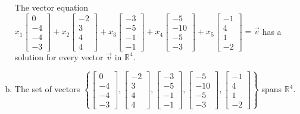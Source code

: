 \begin{exerciseAnswer}
\begin{enumerate}[(a)]
\begin{center}\begin{minipage}{0.8\textwidth}
 The vector equation \( x_{1} \left[\begin{array}{c}
0 \\
-4 \\
-4 \\
-3
\end{array}\right] + x_{2} \left[\begin{array}{c}
-2 \\
3 \\
4 \\
4
\end{array}\right] + x_{3} \left[\begin{array}{c}
-3 \\
-5 \\
-1 \\
-1
\end{array}\right] + x_{4} \left[\begin{array}{c}
-5 \\
-10 \\
-5 \\
-3
\end{array}\right] + x_{5} \left[\begin{array}{c}
-1 \\
4 \\
1 \\
-2
\end{array}\right] =\vec{v}\) has a solution for every vector \(\vec{v}\) in \(\mathbb{R}^4\). 
\end{minipage}\end{center}
    
\item  The set of vectors \( \left\{ \left[\begin{array}{c}
0 \\
-4 \\
-4 \\
-3
\end{array}\right] , \left[\begin{array}{c}
-2 \\
3 \\
4 \\
4
\end{array}\right] , \left[\begin{array}{c}
-3 \\
-5 \\
-1 \\
-1
\end{array}\right] , \left[\begin{array}{c}
-5 \\
-10 \\
-5 \\
-3
\end{array}\right] , \left[\begin{array}{c}
-1 \\
4 \\
1 \\
-2
\end{array}\right] \right\} \) spans \(\mathbb{R}^4\). 
\end{enumerate}
    
\end{exerciseAnswer}
    
